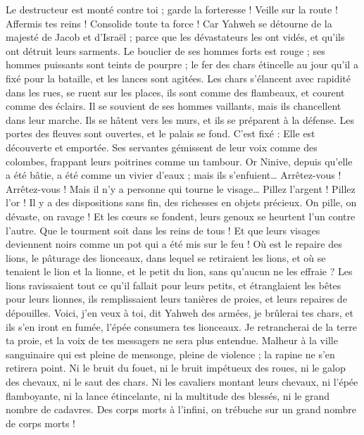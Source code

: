 \begin{multicols}{2}
Le destructeur est monté contre toi ; garde la forteresse ! Veille sur la route ! Affermis tes reins ! Consolide toute ta force !
Car Yahweh se détourne de la majesté de Jacob et d'Israël ; parce que les dévastateurs les ont vidés, et qu'ils ont détruit leurs sarments.
Le bouclier de ses hommes forts est rouge ; ses hommes puissants sont teints de pourpre ; le fer des chars étincelle au jour qu'il a fixé pour la bataille, et les lances sont agitées.
Les chars s’élancent avec rapidité dans les rues, se ruent sur les places, ils sont comme des flambeaux, et courent comme des éclairs.
Il se souvient de ses hommes vaillants, mais ils chancellent dans leur marche. Ils se hâtent vers les murs, et ils se préparent à la défense.
Les portes des fleuves sont ouvertes, et le palais se fond.
C’est fixé : Elle est découverte et emportée. Ses servantes gémissent de leur voix comme des colombes, frappant leurs poitrines comme un tambour.
Or Ninive, depuis qu'elle a été bâtie, a été comme un vivier d'eaux ; mais ils s'enfuient… Arrêtez-vous ! Arrêtez-vous ! Mais il n'y a personne qui tourne le visage…
Pillez l'argent ! Pillez l'or ! Il y a des dispositions sans fin, des richesses en objets précieux.
On pille, on dévaste, on ravage ! Et les cœurs se fondent, leurs genoux se heurtent l'un contre l'autre. Que le tourment soit dans les reins de tous ! Et que leurs visages deviennent noirs comme un pot qui a été mis sur le feu !
Où est le repaire des lions, le pâturage des lionceaux, dans lequel se retiraient les lions, et où se tenaient le lion et la lionne, et le petit du lion, sans qu'aucun ne les effraie ?
Les lions ravissaient tout ce qu'il fallait pour leurs petits, et étranglaient les bêtes pour leurs lionnes, ils remplissaient leurs tanières de proies, et leurs repaires de dépouilles.
Voici, j'en veux à toi, dit Yahweh des armées, je brûlerai tes chars, et ils s'en iront en fumée, l'épée consumera tes lionceaux. Je retrancherai de la terre ta proie, et la voix de tes messagers ne sera plus entendue.
\VerseOne{}Malheur à la ville sanguinaire qui est pleine de mensonge, pleine de violence ; la rapine ne s'en retirera point.
Ni le bruit du fouet, ni le bruit impétueux des roues, ni le galop des chevaux, ni le saut des chars.
Ni les cavaliers montant leurs chevaux, ni l'épée flamboyante, ni la lance étincelante, ni la multitude des blessés, ni le grand nombre de cadavres. Des corps morts à l’infini, on trébuche sur un grand nombre de corps morts !

\end{multicols}
